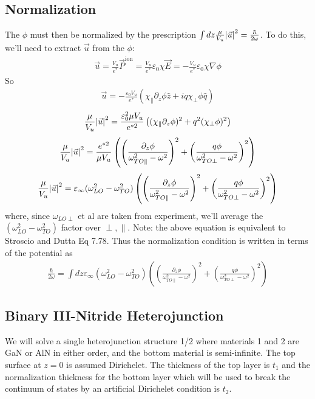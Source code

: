\documentclass{article}
\begin{document}
\subsection{Normalization}
The $\phi$ must then be normalized by the prescription $\int dz\frac{\mu}{V_u}\abs{\vec u}^2=\frac{\hbar}{2\omega}$.  To do this, we'll need to extract $\vec u$ from the $\phi$:
\begin{align}
  \vec u = \frac{V_u}{e^*}\vec P^\mathrm{ion}=\frac{V_u}{e^*}\varepsilon_0\chi\vec E=-\frac{V_u}{e^*}\varepsilon_0\chi\nabla\phi
\end{align}
So
\begin{align}
  \vec u = -\frac{\varepsilon_0V_u}{e^*}\left( \chi_\parallel \partial_z\phi \hat{z} +iq\chi_\perp\phi\hat{q} \right)
\end{align}
\begin{align}
  \frac{\mu}{V_u}\abs{\vec u}^2 = \frac{\varepsilon_0^2\mu V_u}{e^{*2}}\left( (\chi_\parallel \partial_z\phi)^2 +q^2(\chi_\perp\phi)^2 \right)
\end{align}
\begin{align}
  \frac{\mu}{V_u}\abs{\vec u}^2 = \frac{e^{*2}}{\mu V_u}\left( \left(\frac{\partial_z\phi}{\omega_{TO\parallel}^2-\omega^2}\right)^2 +\left(\frac{q\phi}{\omega^2_{TO\perp}-\omega^2}\right)^2 \right)
\end{align}
\begin{align}
  \frac{\mu}{V_u}\abs{\vec u}^2 = \varepsilon_\infty(\omega^2_{LO}-\omega^2_{TO})\left( \left(\frac{\partial_z\phi}{\omega_{TO\parallel}^2-\omega^2}\right)^2 +\left(\frac{q\phi}{\omega^2_{TO\perp}-\omega^2}\right)^2 \right)
\end{align}
where, since $\omega_{LO\perp}$ et al are taken from experiment, we'll average the $(\omega_{LO}^2-\omega_{TO}^2)$ factor over $\perp, \parallel$.  Note: the above equation is equivalent to Stroscio and Dutta Eq 7.78.
Thus the normalization condition is written in terms of the potential as
\begin{align}
  \frac{\hbar}{2\omega} = \int dz \varepsilon_\infty(\omega^2_{LO}-\omega^2_{TO})\left( \left(\frac{\partial_z\phi}{\omega_{TO\parallel}^2-\omega^2}\right)^2 +\left(\frac{q\phi}{\omega^2_{TO\perp}-\omega^2}\right)^2 \right)
\end{align}



\subsection{Binary III-Nitride Heterojunction}
We will solve a single heterojunction structure 1/2 where materials 1 and 2 are GaN or AlN in either order, and the bottom material is semi-infinite.  The top surface at $z=0$ is assumed Dirichelet.  The thickness of the top layer is $t_1$ and the normalization thickness for the bottom layer which will be used to break the continuum of states by an artificial Dirichelet condition is $t_2$.
\end{document}
